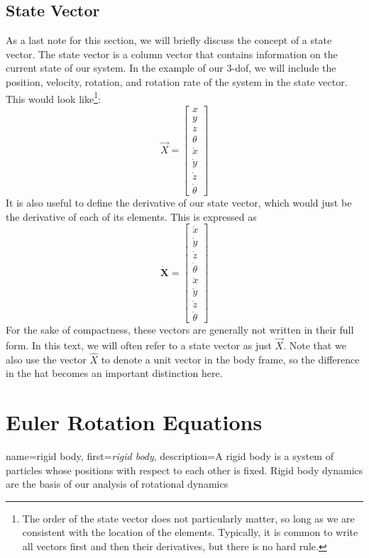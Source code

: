 \documentclass[12pt]{report}
\begin{document}
\subsection{State Vector}
As a last note for this section, we will briefly discuss the concept of a \gls{state vector}. The \gls{state vector} is a column vector that contains information on the current state of our system. In the example of our 3-\gls{dof}, we will include the position, velocity, rotation, and rotation rate of the system in the \gls{state vector}. This would look like\footnote{The order of the state vector does not particularly matter, so long as we are consistent with the location of the elements. Typically, it is common to write all vectors first and then their derivatives, but there is no hard rule.}:
$$\vec{X}=\begin{bmatrix}
    x\\y\\z\\\theta\\\dot{x}\\\dot{y}\\\dot{z}\\\dot{\theta}
\end{bmatrix}$$
It is also useful to define the derivative of our \gls{state vector}, which would just be the derivative of each of its elements. This is expressed as
$$\dot{\textbf{X}}=\begin{bmatrix}
    \dot{x}\\\dot{y}\\\dot{z}\\\dot{\theta}\\\ddot{x}\\\ddot{y}\\\ddot{z}\\\ddot{\theta}
\end{bmatrix}$$
For the sake of compactness, these vectors are generally not written in their full form. In this text, we will often refer to a \gls{state vector} as just $\vec{X}$. Note that we also use the vector $\hat{X}$ to denote a unit vector in the \gls{body frame}, so the difference in the hat becomes an important distinction here.
\section{Euler Rotation Equations}\label{Euler Rotation Equations}
{
    name=rigid body,
    first=\textit{rigid body},
    description={A rigid body is a system of particles whose positions with respect to each other is fixed. Rigid body dynamics are the basis of our analysis of rotational dynamics}
}
\end{document}
